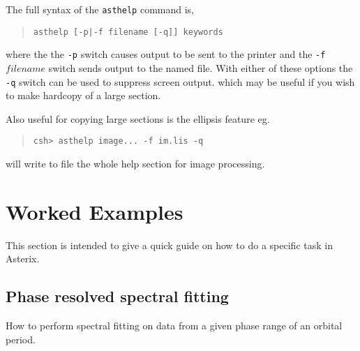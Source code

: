 \documentclass{book}
\renewcommand{\_}{{\tt\char'137}}     %
\begin{document}
The full syntax of the {\tt asthelp} command is,
\begin{quote}\begin{verbatim}
asthelp [-p|-f filename [-q]] keywords
\end{verbatim}\end{quote}
where the the {\tt -p} switch causes output to be sent to the
printer and the {\tt -f} $filename$ switch sends output
to the named file. With either of these options the {\tt -q}
switch can be used to suppress screen output. which may be
useful if you wish to make hardcopy of a large section.
 
Also useful for copying large sections is the ellipsis
feature eg.
 
\begin{quote}\begin{verbatim}
csh> asthelp image... -f im.lis -q
\end{verbatim}\end{quote}
will write to file the whole help section for image processing.
 
\chapter{Worked Examples}
This section is intended to give a quick guide on how to do
a specific task in Asterix.
 
\section{Phase resolved spectral fitting}
How to perform spectral fitting on data from a given phase range
of an orbital period.
 
\end{document}

